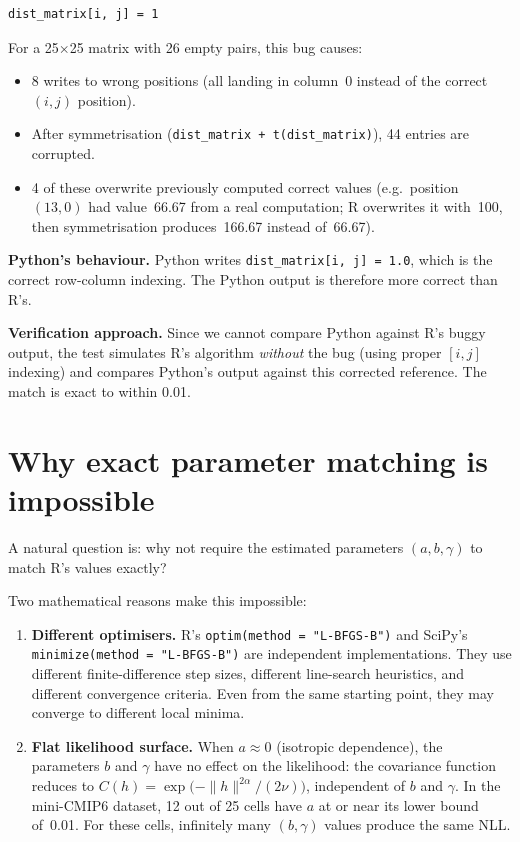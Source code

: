 \documentclass[12pt,a4paper]{article}
\begin{document}
\begin{lstlisting}
dist_matrix[i, j] = 1
\end{lstlisting}

For a 25$\times$25 matrix with 26 empty pairs, this bug causes:

\begin{itemize}[nosep]
  \item 8 writes to wrong positions (all landing in column~0 instead
        of the correct $(i, j)$ position).
  \item After symmetrisation (\texttt{dist\_matrix + t(dist\_matrix)}),
        44 entries are corrupted.
  \item 4 of these overwrite previously computed correct values
        (e.g.\ position $(13, 0)$ had value~66.67 from a real
        computation; R overwrites it with~100, then symmetrisation
        produces~166.67 instead of~66.67).
\end{itemize}

\textbf{Python's behaviour.}
Python writes \texttt{dist\_matrix[i, j] = 1.0}, which is the
correct row-column indexing.  The Python output is therefore more
correct than R's.

\textbf{Verification approach.}
Since we cannot compare Python against R's buggy output, the test
simulates R's algorithm \emph{without} the bug (using proper
$[i, j]$ indexing) and compares Python's output against this
corrected reference.  The match is exact to within 0.01.

\section{Why exact parameter matching is impossible}
\label{sec:identifiability}

A natural question is: why not require the estimated parameters
$(a, b, \gamma)$ to match R's values exactly?

Two mathematical reasons make this impossible:

\begin{enumerate}
  \item \textbf{Different optimisers.}
    R's \texttt{optim(method = "L-BFGS-B")} and SciPy's
    \texttt{minimize(method = "L-BFGS-B")} are independent
    implementations.  They use different finite-difference step
    sizes, different line-search heuristics, and different
    convergence criteria.  Even from the same starting point,
    they may converge to different local minima.

  \item \textbf{Flat likelihood surface.}
    When $a \approx 0$ (isotropic dependence), the parameters $b$
    and $\gamma$ have no effect on the likelihood: the covariance
    function reduces to
    $C(h) = \exp\bigl(-\|h\|^{2\alpha} / (2\nu)\bigr)$,
    independent of $b$ and $\gamma$.
    In the mini-CMIP6 dataset, 12 out of 25 cells have $a$
    at or near its lower bound of~0.01.  For these cells,
    infinitely many $(b, \gamma)$ values produce the same NLL.
\end{enumerate}
\end{document}

